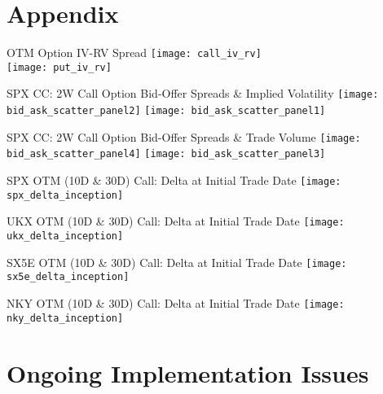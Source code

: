 \documentclass{beamer}
\begin{document}
\section{Appendix}

\begin{frame}{OTM Option IV-RV Spread}
\texttt{[image: call\_iv\_rv]}\\
\texttt{[image: put\_iv\_rv]}
\end{frame}

\begin{frame}{\large SPX CC: 2W Call Option Bid-Offer Spreads \& Implied Volatility}
\texttt{[image: bid\_ask\_scatter\_panel2]}
\texttt{[image: bid\_ask\_scatter\_panel1]}
\end{frame}

\begin{frame}{\large SPX CC: 2W Call Option Bid-Offer Spreads \& Trade Volume}
\texttt{[image: bid\_ask\_scatter\_panel4]}
\texttt{[image: bid\_ask\_scatter\_panel3]}
\end{frame}

\begin{frame}{SPX OTM (10D \& 30D) Call: Delta at Initial Trade Date}
\texttt{[image: spx\_delta\_inception]}
\end{frame}
\begin{frame}{UKX OTM (10D \& 30D) Call: Delta at Initial Trade Date}
\texttt{[image: ukx\_delta\_inception]}
\end{frame}
\begin{frame}{SX5E OTM (10D \& 30D) Call: Delta at Initial Trade Date}
\texttt{[image: sx5e\_delta\_inception]}
\end{frame}
\begin{frame}{NKY OTM (10D \& 30D) Call: Delta at Initial Trade Date}
\texttt{[image: nky\_delta\_inception]}
\end{frame}

\section{Ongoing Implementation Issues}
\end{document}
